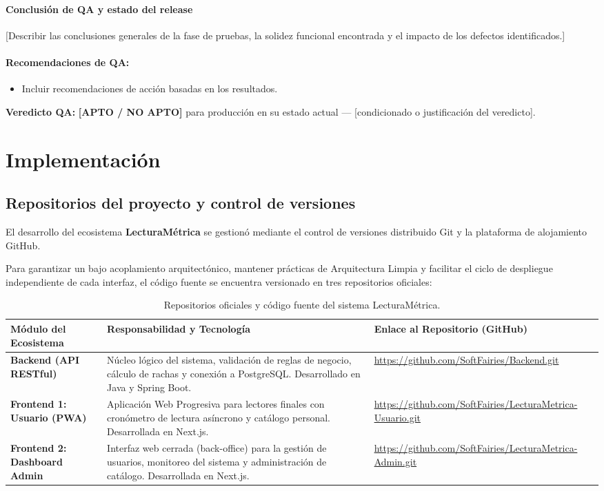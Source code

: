 \documentclass[12pt, atypical, journal]{article}
\begin{document}
\paragraph{Conclusión de QA y estado del release}
[Describir las conclusiones generales de la fase de pruebas, la solidez funcional encontrada y el impacto de los defectos identificados.]

\paragraph{Recomendaciones de QA:}
\begin{itemize}
    \item Incluir recomendaciones de acción basadas en los resultados.
\end{itemize}

\noindent\textbf{Veredicto QA:} \textbf{[APTO / NO APTO]} para producción en su estado actual — [condicionado o justificación del veredicto].

\section{Implementación}

\subsection{Repositorios del proyecto y control de versiones}
El desarrollo del ecosistema \textbf{LecturaMétrica} se gestionó mediante el control de versiones distribuido Git y la plataforma de alojamiento GitHub. 

Para garantizar un bajo acoplamiento arquitectónico, mantener prácticas de Arquitectura Limpia y facilitar el ciclo de despliegue independiente de cada interfaz, el código fuente se encuentra versionado en tres repositorios oficiales:

\begin{table}[H]
\centering
\footnotesize
\begin{tabular}{|p{3.8cm}|p{6.2cm}|p{4.5cm}|}
\hline
\textbf{Módulo del Ecosistema} & \textbf{Responsabilidad y Tecnología} & \textbf{Enlace al Repositorio (GitHub)} \\ \hline
\textbf{Backend (API RESTful)} & Núcleo lógico del sistema, validación de reglas de negocio, cálculo de rachas y conexión a PostgreSQL. Desarrollado en Java y Spring Boot. & \url{https://github.com/SoftFairies/Backend.git} \\ \hline
\textbf{Frontend 1: Usuario (PWA)} & Aplicación Web Progresiva para lectores finales con cronómetro de lectura asíncrono y catálogo personal. Desarrollada en Next.js. & \url{https://github.com/SoftFairies/LecturaMetrica-Usuario.git} \\ \hline
\textbf{Frontend 2: Dashboard Admin} & Interfaz web cerrada (back-office) para la gestión de usuarios, monitoreo del sistema y administración de catálogo. Desarrollada en Next.js. & \url{https://github.com/SoftFairies/LecturaMetrica-Admin.git} \\ \hline
\end{tabular}
\caption{Repositorios oficiales y código fuente del sistema LecturaMétrica.}
\label{tab:repositorios_github}
\end{table}
\end{document}
